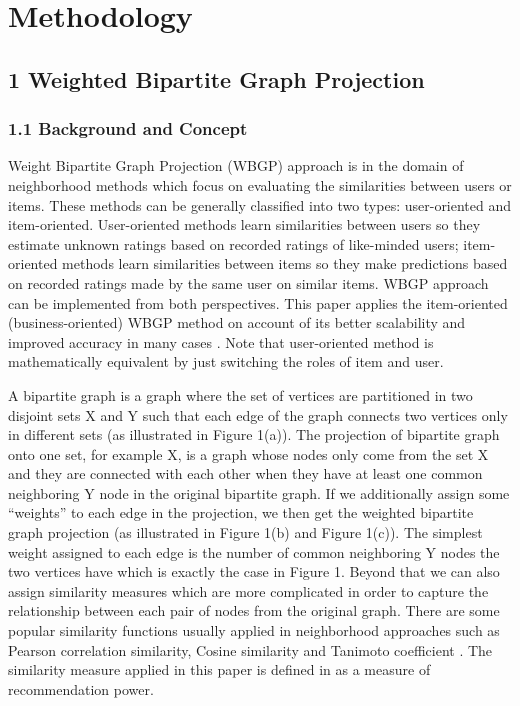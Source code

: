 \documentclass{article}
\begin{document}
\section*{Methodology} %

\subsection*{1  Weighted Bipartite Graph Projection}

\subsubsection*{1.1  Background and Concept}

\noindent Weight Bipartite Graph Projection (WBGP) approach is in the domain of 
neighborhood methods which focus on evaluating the similarities between users or items. 
These methods can be generally classified into two types: user-oriented and item-oriented. 
User-oriented methods learn similarities between users so they estimate unknown ratings based 
on recorded ratings of like-minded users; item-oriented methods learn similarities between items 
so they make predictions based on recorded ratings made by the same user on similar items. WBGP 
approach can be implemented from both perspectives. This paper applies the item-oriented 
(business-oriented) WBGP method on account of its better scalability and improved accuracy 
in many cases \cite{hu2008collaborative}. Note that user-oriented method is mathematically equivalent by just switching 
the roles of item and user.


\indent A bipartite graph is a graph where the set of vertices are partitioned 
in two disjoint sets X and Y such that each edge of the graph connects two vertices only 
in different sets (as illustrated in Figure 1(a)). The projection of bipartite graph onto one set, 
for example X, is a graph whose nodes only come from the set X and they are connected with each other 
when they have at least one common neighboring Y node in the original bipartite graph. 
If we additionally assign some “weights” to each edge in the projection, we then get the weighted 
bipartite graph projection (as illustrated in Figure 1(b) and Figure 1(c)). The simplest weight 
assigned to each edge is the number of common neighboring Y nodes the two vertices have which is 
exactly the case in Figure 1. Beyond that we can also assign similarity measures which are more 
complicated in order to capture the relationship between each pair of nodes from the original graph. 
There are some popular similarity functions usually applied in neighborhood approaches such as Pearson 
correlation similarity, Cosine similarity and Tanimoto coefficient \cite{kupisz2015collaborative}. The similarity measure applied 
in this paper is defined in \cite{sawant2013collaborative} \cite{shang2008personal}as a measure of recommendation power.
\end{document}
